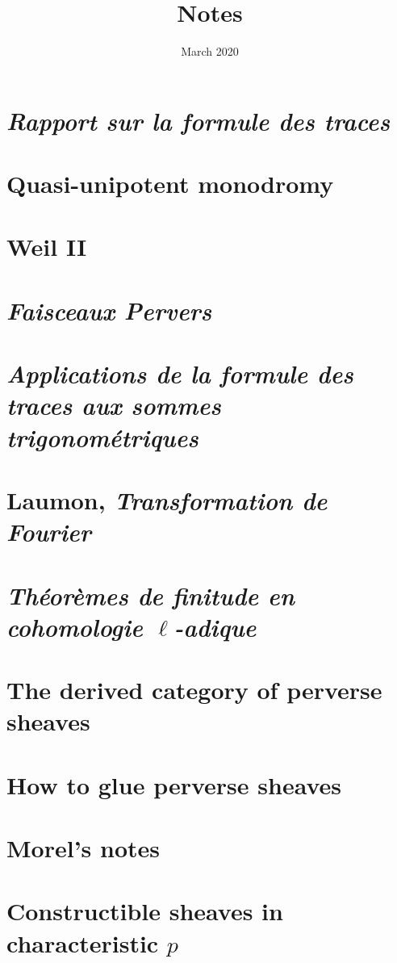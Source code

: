 \documentclass[12pt, fleqn, oneside, reqno]{amsbook}
\title{Notes}
\date{March 2020}
\theoremstyle{bfth}
\theoremstyle{bfthstar}
\theoremstyle{definition}
\theoremstyle{remark}
\begin{document}
\maketitle
{\setlength{\parskip}{0.5em}\small\tableofcontents\par}

\section{\emph{Rapport sur la formule des traces}}


\newpage
\setcounter{section}{1}
\section{Quasi-unipotent monodromy}


\newpage
\setcounter{section}{2}
\section{Weil II}


\newpage
\section{\emph{Faisceaux Pervers}}


\newpage
\section{\emph{Applications de la formule des traces aux sommes trigonométriques}}\label{sec:sommes_trig}


\newpage
\section{Laumon, \emph{Transformation de Fourier}}
\label{sec:laumon}


\newpage
\section{\emph{Théorèmes de finitude en
cohomologie $\ell$-adique}}\label{sec:thfin}


\newpage
\section{The derived category of perverse sheaves}


\newpage
\section{How to glue perverse sheaves}


\newpage
\section{Morel's notes}\label{morel}


\newpage
\section{Constructible sheaves in characteristic $p$}\label{derived_p}

\end{document}
